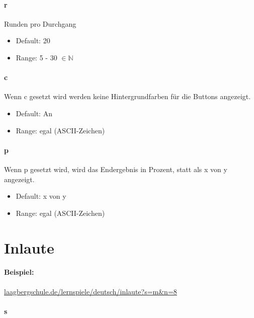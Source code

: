 \documentclass[
  paper=a4,
  ,captions=tableheading
]{scrartcl}
\providecommand{\tightlist}{%
  \setlength{\itemsep}{0pt}\setlength{\parskip}{0pt}}
\begin{document}
\hypertarget{r}{%
\paragraph{r}\label{r}}

Runden pro Durchgang

\begin{itemize}
\tightlist
\item
  Default: 20
\item
  Range: 5 - 30 \(\in \mathbb{N}\)
\end{itemize}

\hypertarget{c-1}{%
\paragraph{c}\label{c-1}}

Wenn c gesetzt wird werden keine Hintergrundfarben für die Buttons
angezeigt.

\begin{itemize}
\tightlist
\item
  Default: An
\item
  Range: egal (ASCII-Zeichen)
\end{itemize}

\hypertarget{p}{%
\paragraph{p}\label{p}}

Wenn p gesetzt wird, wird das Endergebnis in Prozent, statt als x von y
angezeigt.

\begin{itemize}
\tightlist
\item
  Default: x von y
\item
  Range: egal (ASCII-Zeichen)
\end{itemize}

\hypertarget{inlaute}{%
\section{Inlaute}\label{inlaute}}

\hypertarget{beispiel}{%
\paragraph{Beispiel:}\label{beispiel}}

\url{laagbergschule.de/lernspiele/deutsch/inlaute?s=m\&n=8}

\hypertarget{s-1}{%
\paragraph{s}\label{s-1}}
\end{document}
